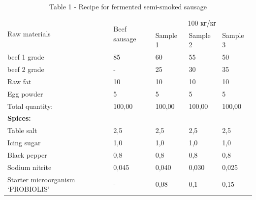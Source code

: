 \begin{table}[H]
\caption*{Table 1 - Recipe for fermented semi-smoked sausage}
\centering
\begin{tabular}{|l|l|lll|}
\hline
\multirow{2}{*}{Raw materials}    & \multirow{2}{*}{Beef sausage} & \multicolumn{3}{c|}{100 кг/кг}                                           \\ \cline{3-5} 
                                  &                               & \multicolumn{1}{l|}{Sample 1} & \multicolumn{1}{l|}{Sample 2} & Sample 3 \\ \hline
beef 1 grade                      & 85                            & \multicolumn{1}{l|}{60}       & \multicolumn{1}{l|}{55}       & 50       \\ \hline
beef 2 grade                      & -                             & \multicolumn{1}{l|}{25}       & \multicolumn{1}{l|}{30}       & 35       \\ \hline
Raw fat                           & 10                            & \multicolumn{1}{l|}{10}       & \multicolumn{1}{l|}{10}       & 10       \\ \hline
Egg powder                        & 5                             & \multicolumn{1}{l|}{5}        & \multicolumn{1}{l|}{5}        & 5        \\ \hline
Total quantity:                   & 100,00                        & \multicolumn{1}{l|}{100,00}   & \multicolumn{1}{l|}{100,00}   & 100,00   \\ \hline
\textbf{Spices:}                  &                               & \multicolumn{1}{l|}{}         & \multicolumn{1}{l|}{}         &          \\ \hline
Table salt                        & 2,5                           & \multicolumn{1}{l|}{2,5}      & \multicolumn{1}{l|}{2,5}      & 2,5      \\ \hline
Icing sugar                       & 1,0                           & \multicolumn{1}{l|}{1,0}      & \multicolumn{1}{l|}{1,0}      & 1,0      \\ \hline
Black pepper                      & 0,8                           & \multicolumn{1}{l|}{0,8}      & \multicolumn{1}{l|}{0,8}      & 0,8      \\ \hline
Sodium nitrite                    & 0,045                         & \multicolumn{1}{l|}{0,040}    & \multicolumn{1}{l|}{0,030}    & 0,025    \\ \hline
Starter microorganism ‘PROBIOLIS’ & -                             & \multicolumn{1}{l|}{0,08}     & \multicolumn{1}{l|}{0,1}      & 0,15     \\ \hline
\end{tabular}
\end{table}

